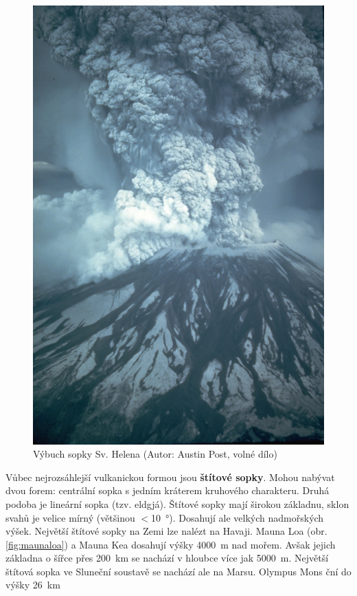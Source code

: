\begin{figure}[h]
	\centering
	\includegraphics[width=\linewidth]{obrazky/sopky/st_helen}
	\caption{Výbuch sopky Sv. Helena (Autor: Austin Post, volné dílo)}
	\label{fig:sthelen}
\end{figure}

Vůbec nejrozsáhlejší vulkanickou formou jsou \textbf{štítové sopky}. Mohou nabývat dvou forem: centrální sopka s jedním kráterem kruhového charakteru. Druhá podoba je lineární sopka (tzv. eldgjá). Štítové sopky mají širokou základnu, sklon svahů je velice mírný (většinou $<$\SI{10}{\degree}). Dosahují ale velkých nadmořských výšek. Největší štítové sopky na Zemi lze nalézt na Havaji. Mauna Loa (obr. \ref{fig:maunaloa}) a Mauna Kea dosahují výšky \SI{4000}{\metre} nad mořem. Avšak jejich základna o šířce přes \SI{200}{\kilo\metre} se nachází v hloubce více jak \SI{5000}{\metre}. Největší štítová sopka ve Sluneční soustavě se nachází ale na Marsu. Olympus Mons ční do výšky \SI{26}{\kilo\metre}

